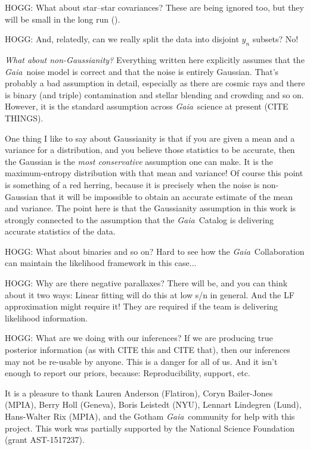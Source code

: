 \documentclass[12pt, modern]{aastex62}
\newcommand{\acronym}[1]{{\small{#1}}}
\newcommand{\Gaia}{\textsl{Gaia}}
\begin{document}
HOGG: What about star--star covariances? These are being ignored too, but they
will be small in the long run (\citealt{holl}).

HOGG: And, relatedly, can we really split the data into disjoint $y_n$ subsets?
No!

\emph{What about non-Gaussianity?} Everything written here
 explicitly assumes that the \Gaia\ noise
model is correct and that the noise is entirely Gaussian.
That's probably a bad assumption in detail,
especially as there are cosmic rays and there is binary (and triple)
contamination and stellar blending and crowding and so on.
However, it is the standard assumption across \Gaia\ science at present (CITE THINGS).

One thing I like to say about Gaussianity is that if you are given a mean
and a variance for a distribution, and you believe those statistics to be
accurate, then the Gaussian is the \emph{most conservative} assumption one
can make.
It is the maximum-entropy distribution with that mean and variance!
Of course this point is something of a red herring, because it is precisely
when the noise is non-Gaussian that it will be impossible to obtain an
accurate estimate of the mean and variance.
The point here is that the Gaussianity assumption in this work is strongly connected
to the assumption that the \Gaia\ Catalog is delivering accurate statistics of
the data.

HOGG: What about binaries and so on? Hard to see how the \Gaia\ Collaboration can
maintain the likelihood framework in this case...

HOGG: Why are there negative parallaxes? There will be, and you can think about
it two ways: Linear fitting will do this at low s/n in general. And the
LF approximation might require it!
They are required if the team is delivering likelihood information.

HOGG: What are we doing with our inferences? If we are producing true posterior
information (as with CITE this and CITE that), then our inferences may not
be re-usable by anyone. This is a danger for all of us. And it isn't enough
to report our priors, because: Reproducibility, support, etc.

\acknowledgements
It is a pleasure to thank
  Lauren Anderson (Flatiron),
  Coryn Bailer-Jones (MPIA),
  Berry Holl (Geneva),
  Boris Leistedt (NYU),
  Lennart Lindegren (Lund),
  Hans-Walter Rix (MPIA),
and the Gotham \Gaia\ community for help with this project.
This work was partially supported by
  the National Science Foundation (grant \acronym{AST-1517237}).


\end{document}
